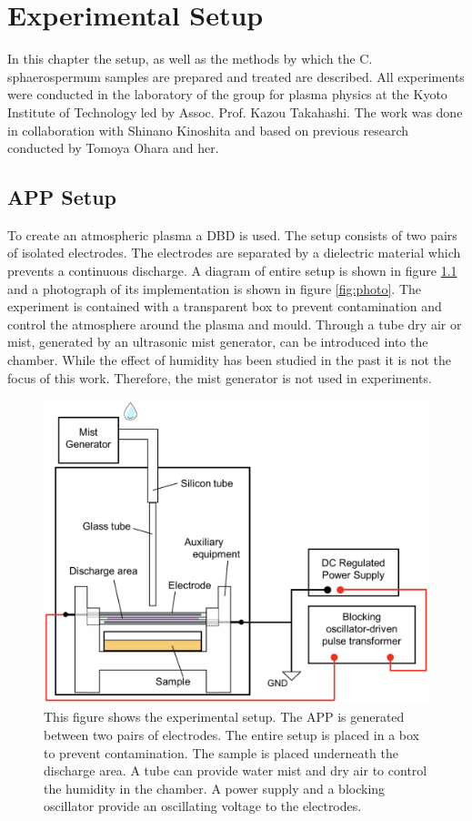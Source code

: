 \chapter{Experimental Setup}
\label{chap:experiment}
In this chapter the setup, as well as the methods by which the C. sphaerospermum samples are prepared and treated are described. All experiments were conducted in the laboratory of the group for plasma physics at the Kyoto Institute of Technology led by Assoc. Prof. Kazou Takahashi. The work was done in collaboration with Shinano Kinoshita and based on previous research \cite{kit} conducted by Tomoya Ohara and her.

\section{APP Setup}
To create an atmospheric plasma a DBD is used. The setup consists of two pairs of isolated electrodes. The electrodes are separated by a dielectric material which prevents a continuous discharge. A diagram of entire setup is shown in figure \ref{fig:setup} and a photograph of its implementation is shown in figure \ref{fig:photo}. The experiment is contained with a transparent box to prevent contamination and control the atmosphere around the plasma and mould. Through a tube dry air or mist, generated by an ultrasonic mist generator, can be introduced into the chamber. While the effect of humidity has been studied in the past \cite{kit} it is not the focus of this work. Therefore, the mist generator is not used in experiments.
\begin{figure}
    \centering
    \includegraphics[width=.6\textwidth]{images/Process_setup.png}
    \caption[Diagram of the setup]{This figure shows the experimental setup. The APP is generated between two pairs of electrodes. The entire setup is placed in a box to prevent contamination. The sample is placed underneath the discharge area. A tube can provide water mist and dry air to control the humidity in the chamber. A power supply and a blocking oscillator provide an oscillating voltage to the electrodes.}
    \label{fig:setup}
\end{figure}

